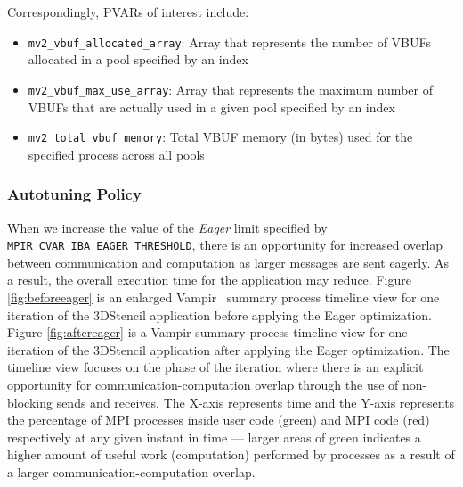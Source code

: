 Correspondingly, PVARs of interest include:
\begin{itemize}
  \item \verb+mv2_vbuf_allocated_array+: Array that represents the number of VBUFs allocated in a pool specified by an index
  \item \verb+mv2_vbuf_max_use_array+: Array that represents the maximum number of VBUFs that are actually used in a given pool specified by an index
  \item \verb+mv2_total_vbuf_memory+: Total VBUF memory (in bytes) used for the specified process across all pools
\end{itemize}

\subsubsection{Autotuning Policy}
When we increase the value of the \emph{Eager} limit specified by \\\verb+MPIR_CVAR_IBA_EAGER_THRESHOLD+, there is an opportunity for increased overlap between communication and computation as larger messages are sent eagerly. As a result, the overall execution time for the application may reduce. Figure \ref{fig:beforeeager} is an enlarged Vampir~\cite{Vampir} summary process timeline view for one iteration of the 3DStencil application before applying the Eager optimization. Figure \ref{fig:aftereager} is a Vampir summary process timeline view for one iteration of the 3DStencil application after applying the Eager optimization. The timeline view focuses on the phase of the iteration where there is an explicit opportunity for communication-computation overlap through the use of non-blocking sends and receives. The X-axis represents time and the Y-axis represents the percentage of MPI processes inside user code (green) and MPI code (red) respectively at any given instant in time --- larger areas of green indicates a higher amount of useful work (computation) performed by processes as a result of a larger communication-computation overlap. 

